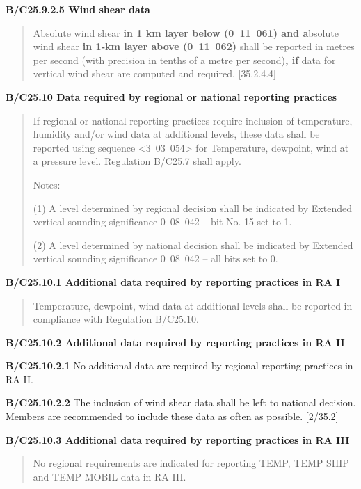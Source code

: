 \textbf{B/C25.9.2.5 Wind shear data}

\begin{quote}
Absolute wind shear \textbf{in 1 km layer below (0~11~061) and a}bsolute wind shear \textbf{in 1‑km layer above (0~11~062)} shall be reported in metres per second (with precision in tenths of a metre per second)\textbf{, if} data for vertical wind shear are computed and required. {[}35.2.4.4{]}
\end{quote}

\textbf{B/C25.10 Data required by regional or national reporting practices}

\begin{quote}
If regional or national reporting practices require inclusion of temperature, humidity and/or wind data at additional levels, these data shall be reported using sequence \textless3~03~054\textgreater{} for Temperature, dewpoint, wind at a pressure level. Regulation B/C25.7 shall apply.

Notes:

(1) A level determined by regional decision shall be indicated by Extended vertical sounding significance 0~08~042 -- bit No. 15 set to 1.

(2) A level determined by national decision shall be indicated by Extended vertical sounding significance 0~08~042 -- all bits set to 0.
\end{quote}

\textbf{B/C25.10.1 Additional data required by reporting practices in RA I}

\begin{quote}
Temperature, dewpoint, wind data at additional levels shall be reported in compliance with Regulation B/C25.10.
\end{quote}

\textbf{B/C25.10.2 Additional data required by reporting practices in RA II}

\textbf{B/C25.10.2.1} No additional data are required by regional reporting practices in RA II.

\textbf{B/C25.10.2.2} The inclusion of wind shear data shall be left to national decision. Members are recommended to include these data as often as possible. {[}2/35.2{]}

\textbf{B/C25.10.3 Additional data required by reporting practices in RA III}

\begin{quote}
No regional requirements are indicated for reporting TEMP, TEMP SHIP and TEMP MOBIL data in RA III.
\end{quote}

